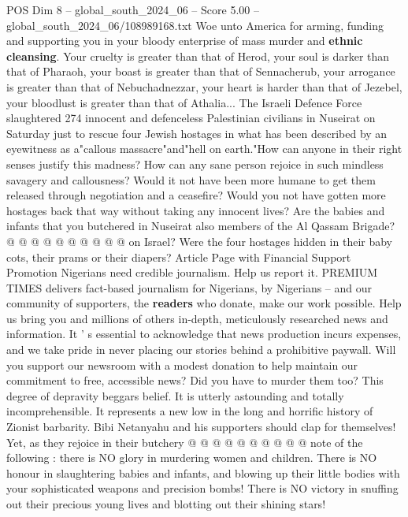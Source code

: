 \begin{textsample}{POS Dim 8 – global\_south\_2024\_06 – Score 5.00 – global\_south\_2024\_06/108989168.txt}  \label{ex:f8_pos_402}
Woe unto America for arming, funding and supporting you in your bloody enterprise of mass murder and \textbf{ethnic} \textbf{cleansing}.
Your cruelty is greater than that of Herod, your soul is darker than that of Pharaoh, your boast is greater than that of Sennacherub, your arrogance is greater than that of Nebuchadnezzar, your heart is harder than that of Jezebel, your bloodlust is greater than that of Athalia...
The Israeli Defence Force slaughtered 274 innocent and defenceless Palestinian civilians in Nuseirat on Saturday just to rescue four Jewish hostages in what has been described by an eyewitness as a"callous massacre"and"hell on earth."How can anyone in their right senses justify this madness?
How can any sane person rejoice in such mindless savagery and callousness?
Would it not have been more humane to get them released through negotiation and a ceasefire?
Would you not have gotten more hostages back that way without taking any innocent lives?
Are the babies and infants that you butchered in Nuseirat also members of the Al Qassam Brigade? @ @ @ @ @ @ @ @ @ @ on Israel?
Were the four hostages hidden in their baby cots, their prams or their diapers?
Article Page with Financial Support Promotion Nigerians need credible journalism.
Help us report it.
PREMIUM TIMES delivers fact-based journalism for Nigerians, by Nigerians -- and our community of supporters, the \textbf{readers} who donate, make our work possible.
Help us bring you and millions of others in-depth, meticulously researched news and information.
It ' s essential to acknowledge that news production incurs expenses, and we take pride in never placing our stories behind a prohibitive paywall.
Will you support our newsroom with a modest donation to help maintain our commitment to free, accessible news?
Did you have to murder them too?
This degree of depravity beggars belief.
It is utterly astounding and totally incomprehensible.
It represents a new low in the long and horrific history of Zionist barbarity.
Bibi Netanyahu and his supporters should clap for themselves!
Yet, as they rejoice in their butchery @ @ @ @ @ @ @ @ @ @ note of the following : there is NO glory in murdering women and children.
There is NO honour in slaughtering babies and infants, and blowing up their little bodies with your sophisticated weapons and precision bombs!
There is NO victory in snuffing out their precious young lives and blotting out their shining stars!

\end{textsample}
